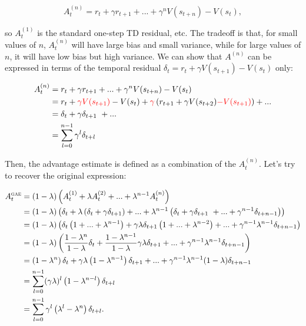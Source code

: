\begin{equation}
	A^{(n)}_t = r_t + \gamma r_{t+1} + ... + \gamma^n V(s_{t+n}) - V(s_t),
\end{equation}

so $A^{(1)}_t$ is the standard one-step TD residual, etc. The tradeoff is that, for small values of $n$, $A^{(n)}_t$ will have large bias and small variance, while for large values of $n$, it will have low bias but high variance. We can show that $A^{(n)}$ can be expressed in terms of the temporal residual $\delta_t = r_t + \gamma V(s_{t+1}) - V(s_t)$ only:

\begin{equation}
\begin{aligned}
	A^{(n)}_t 	&= r_t + \gamma r_{t+1} + ... + \gamma^n V(s_{t+n}) - V(s_t)\\
			&= r_t + \textcolor{red}{\gamma V(s_{t+1})} - V(s_t) + \textcolor{red}{\gamma} \left( r_{t+1} + \gamma V(s_{t+2}) \textcolor{red}{- V(s_{t+1})} \right) + ...\\
			&= \delta_{t} + \gamma \delta_{t+1} + ...\\
			&= \sum_{l=0}^{n-1} \gamma^l \delta_{t+l}
\end{aligned}
\end{equation}

Then, the \gae advantage estimate is defined as a combination of the $A^{(n)}_t$. Let's try to recover the original expression:

\begin{equation}
\label{eq:gae}
\begin{aligned}
	A^{\gae}_t 	&= (1-\lambda) \left( A^{(1)}_t + \lambda A^{(2)}_t + ... + \lambda^{n-1} A^{(n)}_t \right)\\
				&= (1-\lambda) \left( \delta_t + \lambda \left( \delta_t + \gamma \delta_{t+1} \right) + ... + \lambda^{n-1} \left( \delta_t + \gamma \delta_{t+1} + ... + \gamma^{n-1} \delta_{t+n-1} \right) \right)\\
				&= (1-\lambda) \left( \delta_t \left(1 + ... + \lambda^{n-1} \right) + \gamma \lambda \delta_{t+1} \left(1 + ... + \lambda^{n-2} \right) + ... + \gamma^{n-1} \lambda^{n-1} \delta_{t+n-1} \right)\\
				&= (1-\lambda) \left( \frac{1 - \lambda^n}{1 - \lambda} \delta_t + \frac{1 - \lambda^{n-1}}{1 - \lambda} \gamma \lambda \delta_{t+1} + ... + \gamma^{n-1} \lambda^{n-1} \delta_{t+n-1} \right)\\
				&= \left(1-\lambda^{n} \right) \delta_t + \gamma \lambda \left(1-\lambda^{n-1} \right) \delta_{t+1} + ... + \gamma^{n-1} \lambda^{n-1} (1 - \lambda) \delta_{t+n-1}\\
				&= \sum_{l=0}^{n-1} (\gamma \lambda)^l \left(1 - \lambda^{n-l}\right) \delta_{t+l}\\
				&= \sum_{l=0}^{n-1} \gamma^l \left(\lambda^l - \lambda^n\right) \delta_{t+l}.
\end{aligned}
\end{equation}

